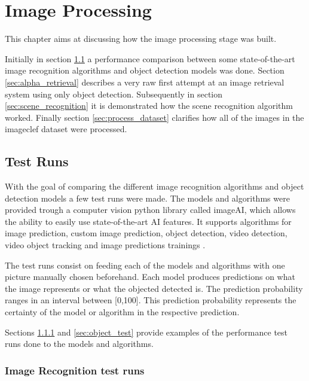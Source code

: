 \cleardoublepage

\chapter{Image Processing}
\label{ch:initial_work}

\par This chapter aims at discussing how the image processing stage was built.
\par Initially in section \ref{sec:testruns} a performance comparison between some state-of-the-art image recognition algorithms and object detection models was done. Section \ref{sec:alpha_retrieval} describes a very raw first attempt at an image retrieval system using only object detection. Subsequently in section \ref{sec:scene_recognition} it is demonstrated how the scene recognition algorithm worked. Finally section \ref{sec:process_dataset} clarifies how all of the images in the imageclef dataset were processed.



  \section{Test Runs}
  \label{sec:testruns}

   With the goal of comparing the different image recognition algorithms and object detection models a few test runs were made. The models and algorithms were provided trough a computer vision python library called imageAI, which allows the ability to easily use state-of-the-art AI features. It supports algorithms for image prediction, custom image prediction, object detection, video detection, video object tracking and image predictions trainings \cite{ImageAI}.

  The test runs consist on feeding each of the models and algorithms with one picture manually chosen beforehand. Each model produces predictions on what the image represents or what the objected detected is. The prediction probability ranges in an interval between [0,100]. This prediction probability represents the certainty of the model or algorithm in the respective prediction.


  \par Sections \ref{sec:image_test} and \ref{sec:object_test} provide examples of the performance test runs done to the models and algorithms.

  \subsection{Image Recognition test runs}
  \label{sec:image_test}


